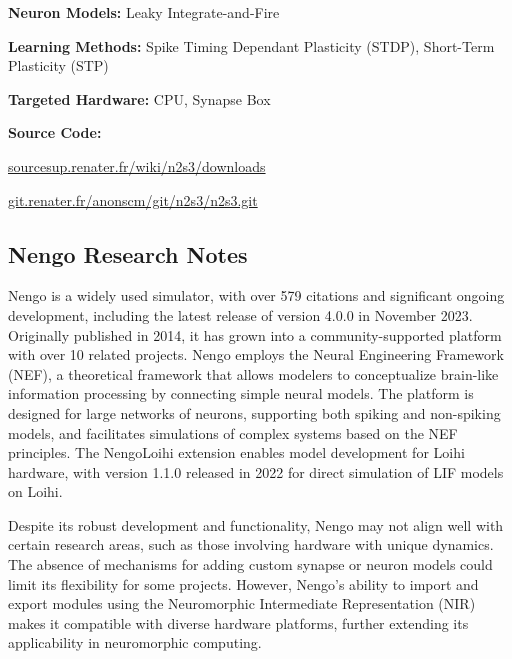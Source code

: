 \begin{tcolorbox}[enhanced,attach boxed title to top center={yshift=-3mm,yshifttext=-1mm}, colback=blue!5!white,colframe=blue!75!black,colbacktitle=red!80!black, title=N2S3 at a Glance,fonttitle=\bfseries, boxed title style={size=small,colframe=red!50!black} ]

\textbf{Neuron Models:} Leaky Integrate-and-Fire

\textbf{Learning Methods:} Spike Timing Dependant Plasticity (STDP), Short-Term Plasticity (STP)  

\textbf{Targeted Hardware:} CPU, Synapse Box 

\textbf{Source Code:} 

\href{https://sourcesup.renater.fr/wiki/n2s3/downloads}{sourcesup.renater.fr/wiki/n2s3/downloads}

\href{https://git.renater.fr/anonscm/git/n2s3/n2s3.git}{git.renater.fr/anonscm/git/n2s3/n2s3.git}
\end{tcolorbox}
\subsection*{Nengo Research Notes}\label{Nengo}

Nengo is a widely used simulator, with over 579 citations and significant ongoing development, including the latest release of version 4.0.0 in November 2023. Originally published in 2014, it has grown into a community-supported platform with over 10 related projects. Nengo employs the Neural Engineering Framework (NEF), a theoretical framework that allows modelers to conceptualize brain-like information processing by connecting simple neural models. The platform is designed for large networks of neurons, supporting both spiking and non-spiking models, and facilitates simulations of complex systems based on the NEF principles. The NengoLoihi extension enables model development for Loihi hardware, with version 1.1.0 released in 2022 for direct simulation of LIF models on Loihi.

Despite its robust development and functionality, Nengo may not align well with certain research areas, such as those involving hardware with unique dynamics. The absence of mechanisms for adding custom synapse or neuron models could limit its flexibility for some projects. However, Nengo’s ability to import and export modules using the Neuromorphic Intermediate Representation (NIR) makes it compatible with diverse hardware platforms, further extending its applicability in neuromorphic computing.








